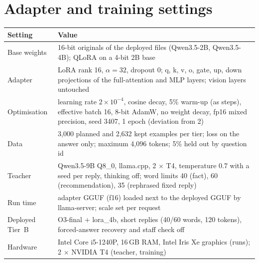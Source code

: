 \documentclass[11pt,a4paper]{article}
\begin{document}
\section{Adapter and training settings}\label{app:config}
\begin{small}
\begin{tabularx}{\textwidth}{l L}
\toprule
Setting & Value \\
\midrule
Base weights & 16-bit originals of the deployed files (Qwen3.5-2B, Qwen3.5-4B); QLoRA on a 4-bit 2B base \\
Adapter & LoRA rank 16, $\alpha = 32$, dropout 0; q, k, v, o, gate, up, down projections of the full-attention and MLP
layers; vision layers untouched \\
Optimisation & learning rate $2\times10^{-4}$, cosine decay, 5\% warm-up (as steps), effective batch 16, 8-bit AdamW, no
weight decay, fp16 mixed precision, seed 3407, 1 epoch (deviation from 2) \\
Data & 3,000 planned and 2,632 kept examples per tier; loss on the answer only; maximum 4,096 tokens; 5\% held out by
question id \\
Teacher & Qwen3.5-9B Q8\_0, llama.cpp, 2 $\times$ T4, temperature 0.7 with a seed per reply, thinking off; word limits 40
(fact), 60 (recommendation), 35 (rephrased fixed reply) \\
Run time & adapter GGUF (f16) loaded next to the deployed GGUF by llama-server; scale set per request \\
Deployed Tier~B & O3-final + lora\_4b, short replies (40/60 words, 120 tokens), forced-answer recovery and staff check off \\
Hardware & Intel Core i5-1240P, 16\,GB RAM, Intel Iris Xe graphics (runs); 2 $\times$ NVIDIA T4 (teacher, training) \\
\bottomrule
\end{tabularx}
\end{small}
\end{document}
